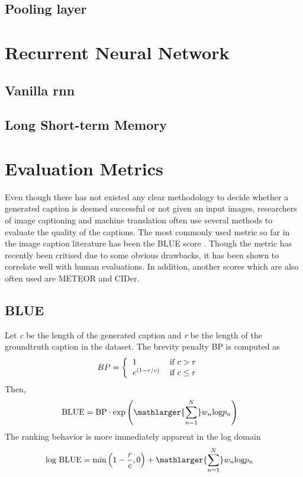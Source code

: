 \subsection{Pooling layer}

\section{Recurrent Neural Network}
\subsection{Vanilla \gls{rnn}}

\subsection{Long Short-term Memory}

\section{Evaluation Metrics}
\label{sec:chap4_metric}
Even though there has not existed any clear methodology to decide whether a generated caption is deemed successful or not given an input images, researchers of image captioning and machine translation often use several methods to evaluate the quality of the captions. The most commonly used metric so far in the image caption literature has been the BLUE score \cite{Papineni:2002:BMA:1073083.1073135}. Though the metric has recently been critised due to some obvious drawbacks, it has been shown to correlate well with human evaluations. In addition, another scores which are also often used are METEOR and CIDer.

\subsection{BLUE}
Let \textit{c} be the length of the generated caption and \textit{r} be the length of the groundtruth caption in the dataset. The brevity penalty BP is computed as
\begin{align}
	BP &= \left\{
		\begin{tabular}{l l}
			1 & if $c > r$ \\
			$e^{\left(1 - r/c\right)}$ & if $c \leq r$
		\end{tabular}
	\right.
\end{align}
Then,
	\begin{align}
		\centering
		\text{BLUE} &= \text{BP} \cdot \text{exp} \left( \mathlarger{ \sum^N_{n=1} } w_n \text{log} p_n \right) 
	\end{align}
The ranking behavior is more immediately apparent in the log domain
\begin{align*}
	\text{log BLUE} &= \text{min} \left(1 - \frac{r}{c}, 0\right) + \mathlarger{\sum^N_{n=1}} w_n\text{log}p_n 
\end{align*}


